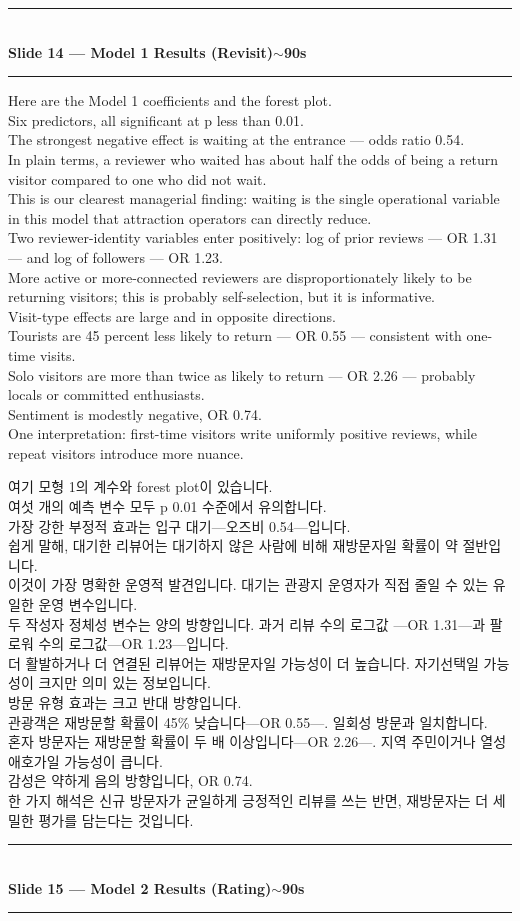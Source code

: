 \documentclass[10pt,a4paper]{article}
\newcommand{\sechead}[2]{%
  \vspace{6pt}%
  \noindent\rule{\linewidth}{0.6pt}\\[1pt]
  {\small\bfseries #1\hfill #2}\\[-3pt]
  \rule{\linewidth}{0.4pt}\par\vspace{2pt}%
}
\newcommand{\sent}[1]{#1\\[5pt]}
\newcommand{\bilingual}[2]{%
  \noindent%
  \begin{minipage}[t]{0.485\linewidth}
    \small #1
  \end{minipage}\hfill\vrule\hfill%
  \begin{minipage}[t]{0.483\linewidth}
    \small #2
  \end{minipage}\par\vspace{4pt}%
}
\begin{document}
\sechead{Slide 14 --- Model 1 Results (Revisit)}{$\sim$90s}

\bilingual{%
\sent{Here are the Model 1 coefficients and the forest plot.}
\sent{Six predictors, all significant at p less than 0.01.}
\sent{The strongest negative effect is waiting at the entrance ---
odds ratio 0.54.}
\sent{In plain terms, a reviewer who waited has about half the odds of
being a return visitor compared to one who did not wait.}
\sent{This is our clearest managerial finding: waiting is the single
operational variable in this model that attraction operators can
directly reduce.}
\sent{Two reviewer-identity variables enter positively: log of prior
reviews --- OR 1.31 --- and log of followers --- OR 1.23.}
\sent{More active or more-connected reviewers are disproportionately
likely to be returning visitors; this is probably self-selection, but
it is informative.}
\sent{Visit-type effects are large and in opposite directions.}
\sent{Tourists are 45 percent less likely to return --- OR 0.55 ---
consistent with one-time visits.}
\sent{Solo visitors are more than twice as likely to return --- OR 2.26
--- probably locals or committed enthusiasts.}
\sent{Sentiment is modestly negative, OR 0.74.}
\sent{One interpretation: first-time visitors write uniformly positive
reviews, while repeat visitors introduce more nuance.}
}{%
\sent{여기 모형 1의 계수와 forest plot이 있습니다.}
\sent{여섯 개의 예측 변수 모두 p 0.01 수준에서 유의합니다.}
\sent{가장 강한 부정적 효과는 입구 대기---오즈비 0.54---입니다.}
\sent{쉽게 말해, 대기한 리뷰어는 대기하지 않은 사람에 비해 재방문자일
확률이 약 절반입니다.}
\sent{이것이 가장 명확한 운영적 발견입니다. 대기는 관광지 운영자가 직접
줄일 수 있는 유일한 운영 변수입니다.}
\sent{두 작성자 정체성 변수는 양의 방향입니다. 과거 리뷰 수의 로그값
---OR 1.31---과 팔로워 수의 로그값---OR 1.23---입니다.}
\sent{더 활발하거나 더 연결된 리뷰어는 재방문자일 가능성이 더 높습니다.
자기선택일 가능성이 크지만 의미 있는 정보입니다.}
\sent{방문 유형 효과는 크고 반대 방향입니다.}
\sent{관광객은 재방문할 확률이 45\% 낮습니다---OR 0.55---. 일회성
방문과 일치합니다.}
\sent{혼자 방문자는 재방문할 확률이 두 배 이상입니다---OR 2.26---.
지역 주민이거나 열성 애호가일 가능성이 큽니다.}
\sent{감성은 약하게 음의 방향입니다, OR 0.74.}
\sent{한 가지 해석은 신규 방문자가 균일하게 긍정적인 리뷰를 쓰는 반면,
재방문자는 더 세밀한 평가를 담는다는 것입니다.}
}

\sechead{Slide 15 --- Model 2 Results (Rating)}{$\sim$90s}
\end{document}
